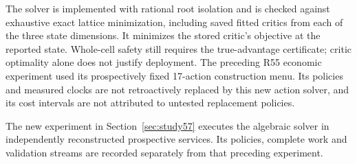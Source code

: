 The solver is implemented with rational root isolation and is checked against exhaustive exact lattice minimization, including saved fitted critics from each of the three state dimensions. It minimizes the stored critic's objective at the reported state. Whole-cell safety still requires the true-advantage certificate; critic optimality alone does not justify deployment. The preceding R55 economic experiment used its prospectively fixed 17-action construction menu. Its policies and measured clocks are not retroactively replaced by this new action solver, and its cost intervals are not attributed to untested replacement policies.

The new experiment in Section~\ref{sec:study57} executes the algebraic solver in independently reconstructed prospective services. Its policies, complete work and validation streams are recorded separately from that preceding experiment.

